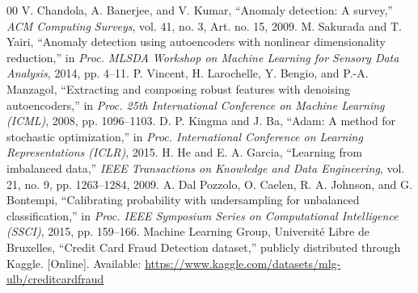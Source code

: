 \documentclass[conference]{IEEEtran}
\begin{document}
\balance
\begin{thebibliography}{00}
 V. Chandola, A. Banerjee, and V. Kumar, ``Anomaly detection: A survey,'' \emph{ACM Computing Surveys}, vol. 41, no. 3, Art. no. 15, 2009.
 M. Sakurada and T. Yairi, ``Anomaly detection using autoencoders with nonlinear dimensionality reduction,'' in \emph{Proc. MLSDA Workshop on Machine Learning for Sensory Data Analysis}, 2014, pp. 4--11.
 P. Vincent, H. Larochelle, Y. Bengio, and P.-A. Manzagol, ``Extracting and composing robust features with denoising autoencoders,'' in \emph{Proc. 25th International Conference on Machine Learning (ICML)}, 2008, pp. 1096--1103.
 D. P. Kingma and J. Ba, ``Adam: A method for stochastic optimization,'' in \emph{Proc. International Conference on Learning Representations (ICLR)}, 2015.
 H. He and E. A. Garcia, ``Learning from imbalanced data,'' \emph{IEEE Transactions on Knowledge and Data Engineering}, vol. 21, no. 9, pp. 1263--1284, 2009.
 A. Dal Pozzolo, O. Caelen, R. A. Johnson, and G. Bontempi, ``Calibrating probability with undersampling for unbalanced classification,'' in \emph{Proc. IEEE Symposium Series on Computational Intelligence (SSCI)}, 2015, pp. 159--166.
 Machine Learning Group, Universit\'e Libre de Bruxelles, ``Credit Card Fraud Detection dataset,'' publicly distributed through Kaggle. [Online]. Available: \url{https://www.kaggle.com/datasets/mlg-ulb/creditcardfraud}
\end{thebibliography}
\end{document}
